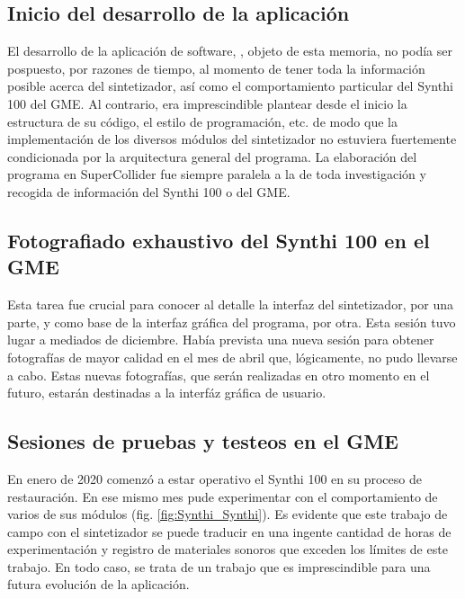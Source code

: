 \subsection{Inicio del desarrollo de la aplicación}

El desarrollo de la aplicación de software, \appName, objeto de esta memoria, no podía ser pospuesto, por razones de tiempo, al momento de tener toda la información posible acerca del sintetizador, así como el comportamiento particular del Synthi 100 del GME. Al contrario, era imprescindible plantear desde el inicio la estructura de su código, el estilo de programación, etc. de modo que la implementación de los diversos módulos del sintetizador no estuviera fuertemente condicionada por la arquitectura general del programa. La elaboración del programa en SuperCollider fue siempre paralela a la de toda investigación y recogida de información del Synthi 100 o del GME.

\subsection{Fotografiado exhaustivo del Synthi 100 en el GME}

Esta tarea fue crucial para conocer al detalle la interfaz del sintetizador, por una parte, y como base de la interfaz gráfica del programa, por otra. Esta sesión tuvo lugar a mediados de diciembre. Había prevista una nueva sesión para obtener fotografías de mayor calidad en el mes de abril que, lógicamente, no pudo llevarse a cabo. Estas nuevas fotografías, que serán realizadas en otro momento en el futuro, estarán destinadas a la interfáz gráfica de usuario.

\subsection{Sesiones de pruebas y testeos en el GME}

En enero de 2020 comenzó a estar operativo el Synthi 100 en su proceso de restauración. En ese mismo mes pude experimentar con el comportamiento de varios de sus módulos (fig. \ref{fig:Synthi_Synthi}). Es evidente que este trabajo de campo con el sintetizador se puede traducir en una ingente cantidad de horas de experimentación y registro de materiales sonoros que exceden los límites de este trabajo. En todo caso, se trata de un trabajo que es imprescindible para una futura evolución de la aplicación.


